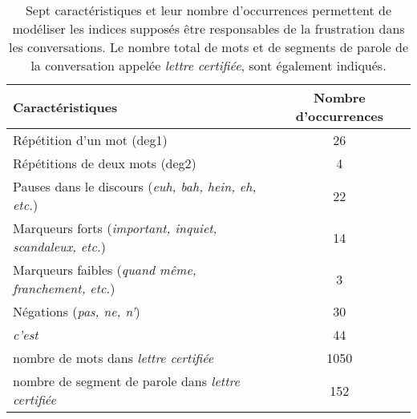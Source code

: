 \begin{table}[]
    \centering
    \begin{tabular}{|l|c|}
      \hline
    \textbf{Caractéristiques} & \textbf{Nombre d'occurrences} \\\hline
    Répétition d'un mot (deg1)     & 26 \\
    Répétitions de deux mots (deg2) & 4\\
    Pauses dans le discours (\textit{euh, bah, hein, eh, etc.}) & 22\\
    Marqueurs forts (\textit{important, inquiet, scandaleux, etc.}) & 14\\
    Marqueurs faibles (\textit{quand même, franchement, etc.}) & 3\\
    Négations (\textit{pas, ne, n'}) & 30\\
    \textit{c'est} & 44\\ \hline
    nombre de mots dans \textit{lettre certifiée} & 1050 \\
    nombre de segment de parole dans \textit{lettre certifiée} & 152 \\ \hline
    \end{tabular}
    \caption{Sept caractéristiques et leur nombre d'occurrences permettent de modéliser les indices supposés être responsables de la frustration dans les conversations. Le nombre total de mots et de segments de parole de la conversation appelée \textit{lettre certifiée}, sont également indiqués.}
    \label{tab:ex_features}
\end{table}
